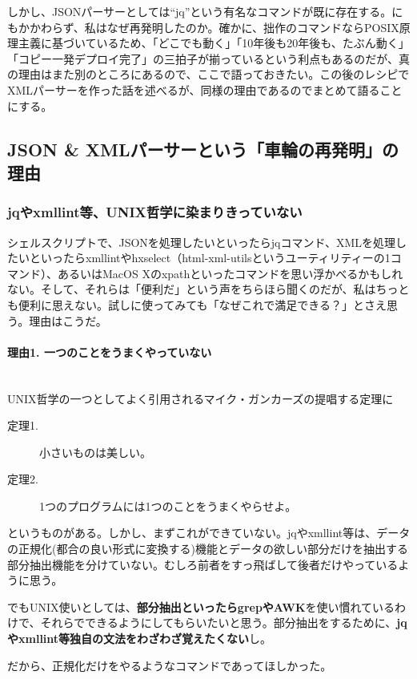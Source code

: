 しかし、JSONパーサーとしては``jq''という有名なコマンドが既に存在する。にもかかわらず、私はなぜ再発明したのか。確かに、拙作のコマンドならPOSIX原理主義に基づいているため、「どこでも動く」「10年後も20年後も、たぶん動く」「コピー一発デプロイ完了」の三拍子が揃っているという利点もあるのだが、真の理由はまた別のところにあるので、ここで語っておきたい。この後のレシピでXMLパーサーを作った話を述べるが、同様の理由であるのでまとめて語ることにする。

\subsection*{JSON \& XMLパーサーという「車輪の再発明」の理由}

\subsubsection*{jqやxmllint等、UNIX哲学に染まりきっていない}

シェルスクリプトで、JSONを処理したいといったらjqコマンド、XMLを処理したいといったらxmllintやhxselect（html-xml-utilsというユーティリティーの1コマンド）、あるいはMacOS Xのxpathといったコマンドを思い浮かべるかもしれない。そして、それらは「便利だ」という声をちらほら聞くのだが、私はちっとも便利に思えない。試しに使ってみても「なぜこれで満足できる？」とさえ思う。理由はこうだ。

\paragraph{理由1. 一つのことをうまくやっていない}　\\
UNIX哲学の一つとしてよく引用されるマイク・ガンカーズの提唱する定理に
\begin{description}
  \item[定理1.] 小さいものは美しい。
  \item[定理2.] 1つのプログラムには1つのことをうまくやらせよ。
\end{description}
というものがある。しかし、まずこれができていない。jqやxmllint等は、データの正規化(都合の良い形式に変換する)機能とデータの欲しい部分だけを抽出する部分抽出機能を分けていない。むしろ前者をすっ飛ばして後者だけやっているように思う。

でもUNIX使いとしては、\textbf{部分抽出といったらgrepやAWK}を使い慣れているわけで、それらでできるようにしてもらいたいと思う。部分抽出をするために、\textbf{jqやxmllint等独自の文法をわざわざ覚えたくない}し。

だから、正規化だけをやるようなコマンドであってほしかった。

